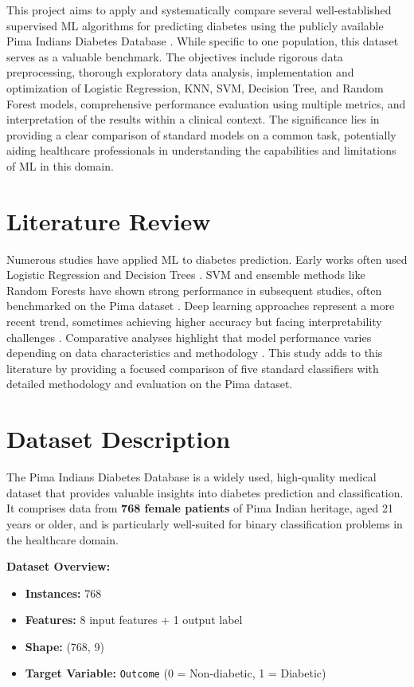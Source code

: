 \documentclass[conference]{IEEEtran}
\begin{document}
This project aims to apply and systematically compare several well-established supervised ML algorithms for predicting diabetes using the publicly available Pima Indians Diabetes Database \cite{pima_uci}. While specific to one population, this dataset serves as a valuable benchmark. The objectives include rigorous data preprocessing, thorough exploratory data analysis, implementation and optimization of Logistic Regression, KNN, SVM, Decision Tree, and Random Forest models, comprehensive performance evaluation using multiple metrics, and interpretation of the results within a clinical context. The significance lies in providing a clear comparison of standard models on a common task, potentially aiding healthcare professionals in understanding the capabilities and limitations of ML in this domain.

\section{Literature Review}
Numerous studies have applied ML to diabetes prediction. Early works often used Logistic Regression and Decision Trees \cite{early_study_example, dt_study}. SVM and ensemble methods like Random Forests have shown strong performance in subsequent studies, often benchmarked on the Pima dataset \cite{svm_study_1, rf_study_1}. Deep learning approaches represent a more recent trend, sometimes achieving higher accuracy but facing interpretability challenges \cite{johnson2019}. Comparative analyses highlight that model performance varies depending on data characteristics and methodology \cite{comparative_study_1}. This study adds to this literature by providing a focused comparison of five standard classifiers with detailed methodology and evaluation on the Pima dataset.

\section{Dataset Description}

The Pima Indians Diabetes Database \cite{pima_uci} is a widely used, high-quality medical dataset that provides valuable insights into diabetes prediction and classification. It comprises data from \textbf{768 female patients} of Pima Indian heritage, aged 21 years or older, and is particularly well-suited for binary classification problems in the healthcare domain.

\vspace{0.5em}
\noindent\textbf{Dataset Overview:}
\begin{itemize}
    \item \textbf{Instances:} 768
    \item \textbf{Features:} 8 input features + 1 output label
    \item \textbf{Shape:} (768, 9)
    \item \textbf{Target Variable:} \texttt{Outcome} (0 = Non-diabetic, 1 = Diabetic)
\end{itemize}
\end{document}

